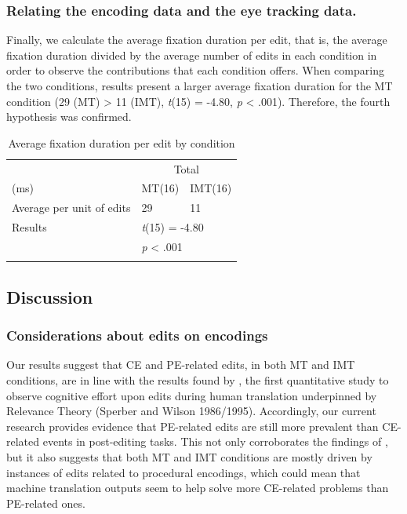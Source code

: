 \documentclass[output=paper]{langsci/langscibook}
\begin{document}
\subsubsection{Relating the encoding data and the eye tracking data.\label{alves:sec:RelatingTheEncodingData}}

Finally, we calculate the average fixation duration per edit, that is, the average fixation duration divided by the average number of edits in each condition in order to observe the contributions that each condition offers. When comparing the two conditions, results present a larger average fixation duration for the MT condition                 (29 (MT) {\textgreater} 11 (IMT), \textit{t}(15) = -4.80, \textit{p} {\textless} .001). Therefore, the fourth hypothesis was confirmed.

\begin{table}
\begin{tabular}{lll}
\lsptoprule
 & \multicolumn{2}{c}{Total}\\
(ms) & {  MT(16)} &   IMT(16)\\
\midrule
Average per unit of edits & {29} & 11\\
Results & \multicolumn{2}{l}{\textit{t}(15) = -4.80}\\
& \multicolumn{2}{l}{ \textit{p} {\textless} .001}\\ 
\lspbottomrule
\end{tabular}
\caption{Average fixation duration per edit by condition}
\label{sarto:tab:5}
\end{table}

\subsection{Discussion\label{alves:sec:Discussion}}

\subsubsection{Considerations about edits on encodings\label{alves:sec:ConsiderationsAboutEditsOnEncodings}}

Our results suggest that CE and PE-related edits, in both MT and IMT conditions, are in line with the results found by \citet{alves2013}, the first quantitative study to observe cognitive effort upon edits during human translation underpinned by Relevance Theory (Sperber and Wilson 1986/1995). Accordingly, our current research provides evidence that PE-related edits are still more prevalent than CE-related events in post-editing tasks. This not only corroborates the findings of \citet{alves2013}, but it also suggests that both MT and IMT conditions are mostly driven by instances of edits related to procedural encodings, which could mean that machine translation outputs seem to help solve more CE-related problems than PE-related ones.
\end{document}
